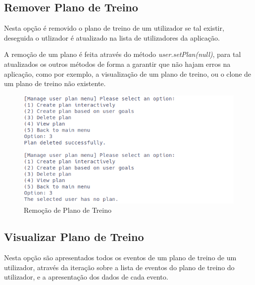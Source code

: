 \documentclass[a4paper,12pt]{scrreprt}
\begin{document}
    \clearpage
    \subsection{Remover Plano de Treino}
    Nesta opção é removido o plano de treino de um utilizador se tal existir,
    deseguida o utlizador é atualizado na lista de utilizadores da aplicação.

    A remoção de um plano é feita através do método \textit{user.setPlan(null)},
    para tal atualizados os outros métodos de forma a garantir que não hajam
    erros na aplicação, como por exemplo, a visualização de um plano de treino,
    ou o clone de um plano de treino não existente.

    \begin{figure}[!ht]
        \centering
        \includegraphics[width=\textwidth]{images/deletePlan.png}
        \caption{Remoção de Plano de Treino}
        \label{fig:remove-plan}
    \end{figure}

    \clearpage
    \subsection{Visualizar Plano de Treino}
    Nesta opção são apresentados todos os eventos de um plano de treino de um utilizador,
    através da iteração sobre a lista de eventos do plano de treino do utilizador,
    e a apresentação dos dados de cada evento.
\end{document}
